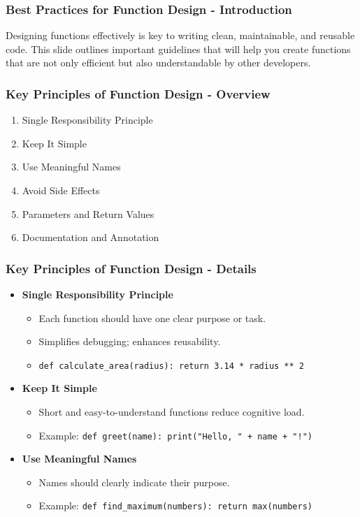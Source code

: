 \documentclass{beamer}
\begin{document}
\begin{frame}[fragile]
    \frametitle{Best Practices for Function Design - Introduction}
    Designing functions effectively is key to writing clean, maintainable, and reusable code. 
    This slide outlines important guidelines that will help you create functions that are not only efficient but also understandable by other developers.
\end{frame}

\begin{frame}[fragile]
    \frametitle{Key Principles of Function Design - Overview}
    \begin{enumerate}
        \item Single Responsibility Principle
        \item Keep It Simple
        \item Use Meaningful Names
        \item Avoid Side Effects
        \item Parameters and Return Values
        \item Documentation and Annotation
    \end{enumerate}
\end{frame}

\begin{frame}[fragile]
    \frametitle{Key Principles of Function Design - Details}
    \begin{itemize}
        \item \textbf{Single Responsibility Principle}
        \begin{itemize}
            \item Each function should have one clear purpose or task.
            \item Simplifies debugging; enhances reusability.
            \item \texttt{def calculate\_area(radius): return 3.14 * radius ** 2}
        \end{itemize}
        
        \item \textbf{Keep It Simple}
        \begin{itemize}
            \item Short and easy-to-understand functions reduce cognitive load.
            \item Example: \texttt{def greet(name): print("Hello, " + name + "!")}
        \end{itemize}
        
        \item \textbf{Use Meaningful Names}
        \begin{itemize}
            \item Names should clearly indicate their purpose.
            \item Example: \texttt{def find\_maximum(numbers): return max(numbers)}
        \end{itemize}
    \end{itemize}
\end{frame}
\end{document}
